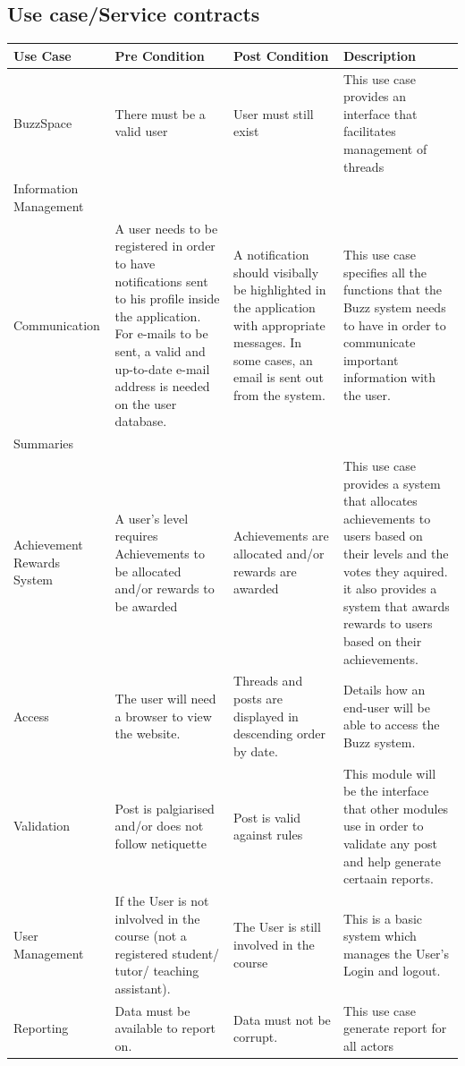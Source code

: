 \documentclass[a4paper,12pt]{report}
\begin{document}
\subsection{Use case/Service contracts}
\begin{center}
  \begin{tabular}{| p{3cm} | p{4cm} | p{4cm} | p{4cm} |}
    \hline
    Use Case & Pre Condition & Post Condition & Description \\ \hline \hline
    BuzzSpace & There must be a valid user & User must still exist & This use case provides an interface that facilitates management of threads\\ \hline
    Information Management &  &  &\\ \hline
    Communication& A user needs to be registered in order to have notifications sent to his profile inside the application. For e-mails to be sent, a valid and up-to-date e-mail address is needed on the user database. & A notification should visibally be highlighted in the application with appropriate messages. In some cases, an email is sent out from the system. & This use case specifies all the functions that the Buzz system needs to have in order to communicate important information with the user. \\ \hline
    Summaries &  &  & \\ \hline
    Achievement Rewards System & A user's level requires Achievements to be allocated and/or rewards to be awarded & Achievements are allocated and/or rewards are awarded & This use case provides a system that allocates achievements to users based on their levels and the votes they aquired. it also provides a system that awards rewards to users based on their achievements.\\ \hline
    Access & The user will need a browser to view the website. & Threads and posts are displayed in descending order by date. & Details how an end-user will be able to access the Buzz system. \\ \hline
    Validation & Post is palgiarised and/or does not follow netiquette & Post is valid against rules  & This module will be the interface that other modules use in order to validate any post and help generate certaain reports.\\ \hline
    User Management & If the User is not inlvolved in the course (not a registered student/ tutor/ teaching assistant).  & The User is still involved in the course & This is a basic system which manages the User's Login and logout. \\ \hline
    Reporting & Data must be available to report on. & Data must not be corrupt. & This use case generate report for all actors\\ \hline
    \hline
  \end{tabular}
\end{center}
\end{document}
